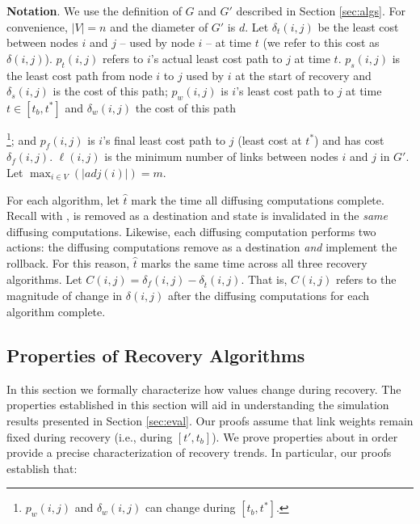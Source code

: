 {\bf Notation}. We use the definition of $G$ and $G'$ described in Section \ref{sec:algs}. For convenience, $|V| = n$ and the diameter of $G'$ is $d$.
Let $\delta_t(i,j)$ be the least cost between nodes $i$ and $j$ -- used by node $i$ --  at time $t$ (we refer to this cost as $\delta(i,j)$).
$p_t(i,j)$ refers to $i$'s actual least cost path to $j$ at time $t$.
 $p_s(i,j)$ is the least cost path from node $i$ to $j$ used by $i$ at the start of recovery 
and $\delta_s(i,j)$ is the cost of this path; $p_w(i,j)$ is $i$'s least cost path to $j$ at time $t \in [t_b,t^*]$ and $\delta_w(i,j)$ the cost of this path 
{\footnote {\small $p_w(i,j)$ and $\delta_w(i,j)$ can change during $[t_b,t^*]$.}; and $p_f(i,j)$ is $i$'s final least cost path to $j$ (least cost at $t^*$)
 and has cost $\delta_f(i,j)$.  $\ell(i,j)$ is the minimum number of links between nodes $i$ and $j$ in $G'$.  
Let $\displaystyle \max_{i \in V}(|adj(i)|) = m$.  

For each algorithm, let $\hat{t}$ mark the time all diffusing computations complete.  Recall with \purges, \bad is removed as a destination and 
\badvector state is invalidated in the \emph{same} diffusing computations.   Likewise, each \cpr diffusing computation performs two actions: 
the diffusing computations remove \bad as a destination \emph{and} implement the rollback.  For this reason, $\hat{t}$ marks the same time across all three recovery algorithms. 
Let $C(i,j) = \delta_f(i,j) - \delta_{\hat{t}}(i,j)$.  That is, $C(i,j)$ refers to the magnitude of change in $\delta(i,j)$ after the diffusing computations for each algorithm complete.


\subsection{Properties of Recovery Algorithms}
\label{subsec:trends}

In this section we formally characterize how \minv values change during recovery. The properties established in this section will aid
in understanding the simulation results presented in Section \ref{sec:eval}. Our proofs assume that link weights remain fixed during recovery (i.e., during $[t',t_b]$).
We prove properties about \minv in order provide a precise characterization of recovery trends.  
In particular, our proofs establish that:

}
